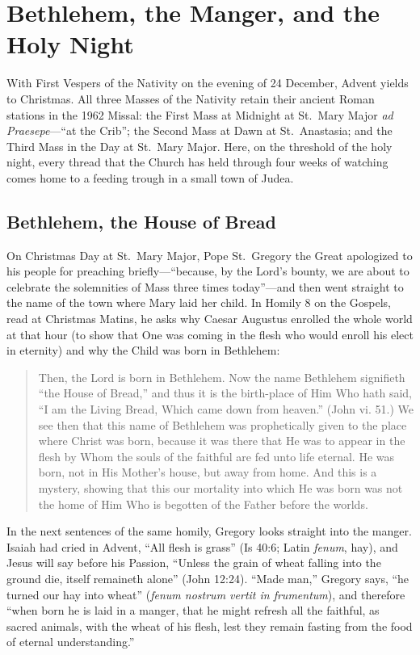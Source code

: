\section{Bethlehem, the Manger, and the Holy Night}\label{sec:bethlehem}

With First Vespers of the Nativity on the evening of 24 December, Advent yields
to Christmas. All three Masses of the Nativity retain their ancient Roman
stations in the 1962 Missal: the First Mass at Midnight at St.~Mary Major
\textit{ad Praesepe}---``at the Crib''; the Second Mass at Dawn at
St.~Anastasia; and the Third Mass in the Day at St.~Mary Major. Here, on the
threshold of the holy night, every thread that the Church has held through four
weeks of watching comes home to a feeding trough in a small town of Judea.

\subsection{Bethlehem, the House of Bread}

On Christmas Day at St.~Mary Major, Pope St.~Gregory the Great apologized to
his people for preaching briefly---``because, by the Lord's bounty, we are
about to celebrate the solemnities of Mass three times today''---and then went
straight to the name of the town where Mary laid her child. In Homily 8 on the
Gospels, read at Christmas Matins, he asks why Caesar Augustus enrolled the
whole world at that hour (to show that One was coming in the flesh who would
enroll his elect in eternity) and why the Child was born in Bethlehem:

\begin{quote}
Then, the Lord is born in Bethlehem. Now the name Bethlehem signifieth ``the
House of Bread,'' and thus it is the birth-place of Him Who hath said, ``I am
the Living Bread, Which came down from heaven.'' (John vi. 51.) We see then
that this name of Bethlehem was prophetically given to the place where Christ
was born, because it was there that He was to appear in the flesh by Whom the
souls of the faithful are fed unto life eternal. He was born, not in His
Mother's house, but away from home. And this is a mystery, showing that this
our mortality into which He was born was not the home of Him Who is begotten of
the Father before the worlds.
\end{quote}

In the next sentences of the same homily, Gregory looks straight into the
manger. Isaiah had cried in Advent, ``All flesh is grass'' (Is 40:6; Latin
\textit{fenum}, hay), and Jesus will say before his Passion, ``Unless the grain
of wheat falling into the ground die, itself remaineth alone'' (John 12:24).
``Made man,'' Gregory says, ``he turned our hay into wheat'' (\textit{fenum
nostrum vertit in frumentum}), and therefore ``when born he is laid in a
manger, that he might refresh all the faithful, as sacred animals, with the
wheat of his flesh, lest they remain fasting from the food of eternal
understanding.''

